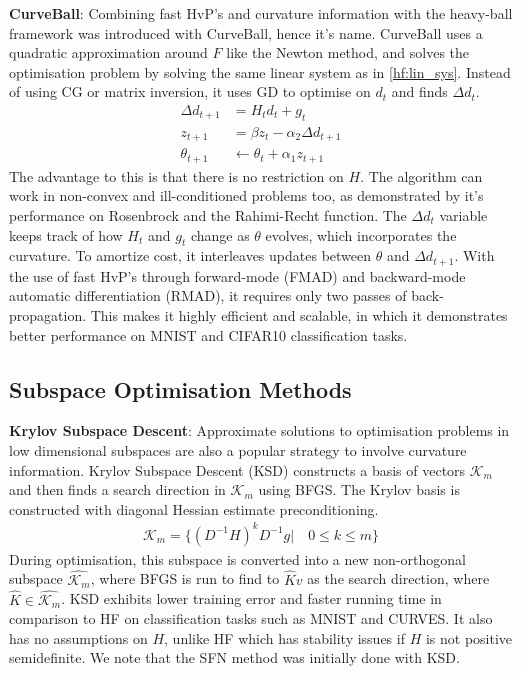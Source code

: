 \textbf{CurveBall}: Combining fast HvP's and curvature information with the heavy-ball framework was introduced with CurveBall, hence it's name. CurveBall uses a quadratic approximation around $F$ like the Newton method, and solves the optimisation problem by solving the same linear system as in \cref{hf:lin_sys}. Instead of using CG or matrix inversion, it uses GD to optimise on $d_t$ and finds $\Delta d_t$. 
\begin{align}
\Delta d_{t+1} &= H_t d_t + g_t \\
z_{t+1} &= \beta z_{t} - \alpha_2 \Delta d_{t+1} \\
\theta_{t+1} &\leftarrow \theta_t + \alpha_1 z_{t+1}
\end{align}
The advantage to this is that there is no restriction on $H$. The algorithm can work in non-convex and ill-conditioned problems too, as demonstrated by it's performance on Rosenbrock and the Rahimi-Recht function. The $\Delta d_{t}$ variable keeps track of how $H_t$ and $g_t$ change as $\theta$ evolves, which incorporates the curvature. To amortize cost, it interleaves updates between $\theta$ and $\Delta d_{t+1}$. With the use of fast HvP's through forward-mode (FMAD) and backward-mode automatic differentiation (RMAD), it requires only two passes of back-propagation. This makes it highly efficient and scalable, in which it demonstrates better performance on MNIST and CIFAR10 classification tasks.  

\subsection{Subspace Optimisation Methods}\label{sec:subspace_opt}

\textbf{Krylov Subspace Descent}: Approximate solutions to optimisation problems in low dimensional subspaces are also a popular strategy to involve curvature information. Krylov Subspace Descent (KSD) constructs a basis of vectors $\mathcal{K}_m$ and then finds a search direction in $\mathcal{K}_m$ using BFGS. The Krylov basis is constructed with diagonal Hessian estimate preconditioning.
\begin{align}
    \mathcal{K}_m = \{(D^{-1}H)^{k}D^{-1}g | \quad 0 \leq k \leq m \}
\end{align}
During optimisation, this subspace is converted into a new non-orthogonal subspace $\hat{\mathcal{K}_m}$, where BFGS is run to find to ${\hat{K}v}$ as the search direction, where $\hat{K} \in \hat{\mathcal{K}_m}$. KSD exhibits lower training error and faster running time in comparison to HF on classification tasks such as MNIST and CURVES. It also has no assumptions on $H$, unlike HF which has stability issues if $H$ is not positive semidefinite. We note that the SFN method was initially done with KSD. 

